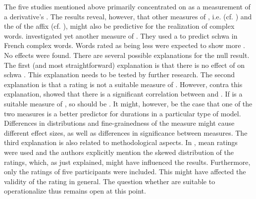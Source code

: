 {{The five studies mentioned above primarily concentrated on  as a measurement of a derivative's . The results reveal, however, that other measures of , i.e.  (cf. \citealt{Hanique.2011}) and the  of the affix (cf. \citealt{Hay.2007}), might also be predictive for the realization of complex words.  
\cite{Burki.2011} investigated yet another measure of . They used a  to predict schwa  in French complex words. Words rated as being less  were expected to show more . No effects were found. There are several possible explanations for the null result. 
The first (and most straightforward) explanation is that there is no effect of  on schwa . This explanation needs to be tested by further research. 
The second explanation is that a rating is not a suitable measure of . However, contra this explanation, \cite{Hay.2001,Hay.2003} showed that there is a significant correlation between  and . If  is a suitable measure of , so should be . It might, however, be the case that one of the two measures is a better predictor for durations in a particular type of model.  Differences in distributions and fine-grainedness of the measure might cause different effect sizes, as well as differences in significance between measures.   
The third explanation is also related to methodological aspects. In \cite{Burki.2011}, mean ratings were used and the authors explicitly mention the skewed distribution of the ratings, which, as just explained, might have influenced the results. Furthermore, only the ratings of five participants were included. This might have affected the validity of the rating in general. 
The question whether  are suitable to operationalize  thus remains open at this point.


}}
